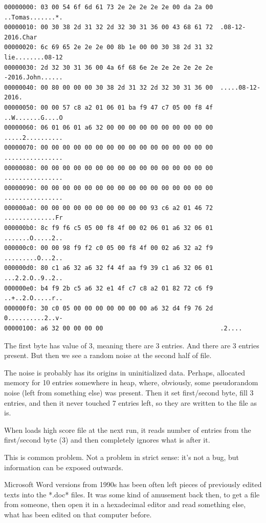 \begin{lstlisting}
00000000: 03 00 54 6f 6d 61 73 2e 2e 2e 2e 2e 00 da 2a 00  ..Tomas.......*.
00000010: 00 30 38 2d 31 32 2d 32 30 31 36 00 43 68 61 72  .08-12-2016.Char
00000020: 6c 69 65 2e 2e 2e 00 8b 1e 00 00 30 38 2d 31 32  lie........08-12
00000030: 2d 32 30 31 36 00 4a 6f 68 6e 2e 2e 2e 2e 2e 2e  -2016.John......
00000040: 00 80 00 00 00 30 38 2d 31 32 2d 32 30 31 36 00  .....08-12-2016.
00000050: 00 00 57 c8 a2 01 06 01 ba f9 47 c7 05 00 f8 4f  ..W.......G....O
00000060: 06 01 06 01 a6 32 00 00 00 00 00 00 00 00 00 00  .....2..........
00000070: 00 00 00 00 00 00 00 00 00 00 00 00 00 00 00 00  ................
00000080: 00 00 00 00 00 00 00 00 00 00 00 00 00 00 00 00  ................
00000090: 00 00 00 00 00 00 00 00 00 00 00 00 00 00 00 00  ................
000000a0: 00 00 00 00 00 00 00 00 00 00 93 c6 a2 01 46 72  ..............Fr
000000b0: 8c f9 f6 c5 05 00 f8 4f 00 02 06 01 a6 32 06 01  .......O.....2..
000000c0: 00 00 98 f9 f2 c0 05 00 f8 4f 00 02 a6 32 a2 f9  .........O...2..
000000d0: 80 c1 a6 32 a6 32 f4 4f aa f9 39 c1 a6 32 06 01  ...2.2.O..9..2..
000000e0: b4 f9 2b c5 a6 32 e1 4f c7 c8 a2 01 82 72 c6 f9  ..+..2.O.....r..
000000f0: 30 c0 05 00 00 00 00 00 00 00 a6 32 d4 f9 76 2d  0..........2..v-
00000100: a6 32 00 00 00 00                                .2....
\end{lstlisting}

The first byte has value of 3, meaning there are 3 entries.
And there are 3 entries present.
But then we see a random noise at the second half of file.

The noise is probably has its origins in uninitialized data.
Perhaps,  allocated memory for 10 entries somewhere in \gls{heap}, where, obviously,
some pseudorandom noise (left from something else) was present.
Then it set first/second byte, fill 3 entries, and then it never touched 7 entries left, so they are written
to the file as is.

When  loads high score file at the next run, it reads number of entries from the first/second byte (3) and
then completely ignores what is after it.

This is common problem.
Not a problem in strict sense: it's not a bug, but information can be exposed outwards.

Microsoft Word versions from 1990s has been often left pieces of previously edited texts into the *.doc* files.
It was some kind of amusement back then, to get a  file from someone,
then open it in a hexadecimal editor and read something else,
what has been edited on that computer before.

